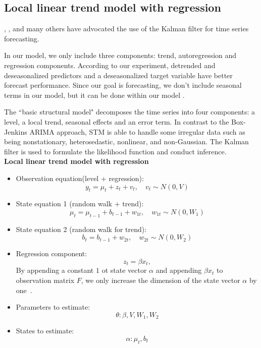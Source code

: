 \subsection{Local linear trend model with regression}

, ,  and many others have advocated the use of the Kalman filter for time series forecasting.


In our model, we only include three components: trend, autoregression and regression components. According to our experiment, detrended and deseasonalized predictors and a deseasonalized target variable have better forecast performance. Since our goal is  forecasting, we don't include seasonal terms in our model, but it can be done within our model \cite{Scott2014b}. 


The ``basic structural model" decomposes the time series into four components: a level, a local trend, seasonal effects and an error term. In contrast to the Box-Jenkins ARIMA approach, STM is able to handle some irregular data such as being nonstationary, heterosedastic, nonlinear, and non-Gaussian. The Kalman filter is used to formulate the likelihood function and conduct inference.\\


\textbf{Local linear trend model with regression}


\begin{itemize}
	\item {Observation equation(level + regression): $$y_t = \mu_t + z_t + v_{t}, \quad v_{t} \sim N(0, V)$$}
	
	\item {State equation 1 (random walk + trend): $$\mu_t = \mu_{t-1} + b_{t-1} + w_{1t}, \quad w_{1t} \sim N(0, W_{1})$$}
	
	\item {State equation 2 (random walk for trend): $$b_t = b_{t-1} + w_{2t}, \quad w_{2t} \sim N(0, W_{2})$$}
	
	
	\item {Regression component: $$z_t = \beta x_t ,$$ By appending a constant $1$ ot state vector $\alpha$ and appending $\beta x_t$ to observation matrix $F$, we only increase the dimension of the state vector $\alpha$ by one~\cite{Scott2014a}.} 
	
\end{itemize}



\begin{itemize}
	\item {Parameters to estimate: $$\theta: \beta, V, W_{1}, W_{2}$$}
	\item {States to estimate: $$\alpha:  \mu_t, b_t $$}
\end{itemize}




